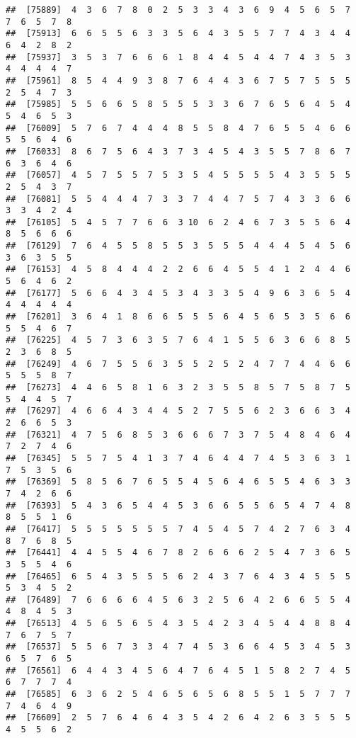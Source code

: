 \documentclass[
]{book}
\begin{document}
\begin{verbatim}
##  [75889]  4  3  6  7  8  0  2  5  3  3  4  3  6  9  4  5  6  5  7  7  6  5  7  8
##  [75913]  6  6  5  5  6  3  3  5  6  4  3  5  5  7  7  4  3  4  4  6  4  2  8  2
##  [75937]  3  5  3  7  6  6  6  1  8  4  4  5  4  4  7  4  3  5  3  4  4  4  4  7
##  [75961]  8  5  4  4  9  3  8  7  6  4  4  3  6  7  5  7  5  5  5  2  5  4  7  3
##  [75985]  5  5  6  6  5  8  5  5  5  3  3  6  7  6  5  6  4  5  4  5  4  6  5  3
##  [76009]  5  7  6  7  4  4  4  8  5  5  8  4  7  6  5  5  4  6  6  5  5  6  4  6
##  [76033]  8  6  7  5  6  4  3  7  3  4  5  4  3  5  5  7  8  6  7  6  3  6  4  6
##  [76057]  4  5  7  5  5  7  5  3  5  4  5  5  5  5  4  3  5  5  5  2  5  4  3  7
##  [76081]  5  5  4  4  4  7  3  3  7  4  4  7  5  7  4  3  3  6  6  3  3  4  2  4
##  [76105]  5  4  5  7  7  6  6  3 10  6  2  4  6  7  3  5  5  6  4  8  5  6  6  6
##  [76129]  7  6  4  5  5  8  5  5  3  5  5  5  4  4  4  5  4  5  6  3  6  3  5  5
##  [76153]  4  5  8  4  4  4  2  2  6  6  4  5  5  4  1  2  4  4  6  5  6  4  6  2
##  [76177]  5  6  6  4  3  4  5  3  4  3  3  5  4  9  6  3  6  5  4  4  4  4  4  4
##  [76201]  3  6  4  1  8  6  6  5  5  5  6  4  5  6  5  3  5  6  6  5  5  4  6  7
##  [76225]  4  5  7  3  6  3  5  7  6  4  1  5  5  6  3  6  6  8  5  2  3  6  8  5
##  [76249]  4  6  7  5  5  6  3  5  5  2  5  2  4  7  7  4  4  6  6  5  5  5  8  7
##  [76273]  4  4  6  5  8  1  6  3  2  3  5  5  8  5  7  5  8  7  5  5  4  4  5  7
##  [76297]  4  6  6  4  3  4  4  5  2  7  5  5  6  2  3  6  6  3  4  2  6  6  5  3
##  [76321]  4  7  5  6  8  5  3  6  6  6  7  3  7  5  4  8  4  6  4  7  2  7  4  6
##  [76345]  5  5  7  5  4  1  3  7  4  6  4  4  7  4  5  3  6  3  1  7  5  3  5  6
##  [76369]  5  8  5  6  7  6  5  5  4  5  6  4  6  5  5  4  6  3  3  7  4  2  6  6
##  [76393]  5  4  3  6  5  4  4  5  3  6  6  5  5  6  5  4  7  4  8  8  5  5  1  6
##  [76417]  5  5  5  5  5  5  5  7  4  5  4  5  7  4  2  7  6  3  4  8  7  6  8  5
##  [76441]  4  4  5  5  4  6  7  8  2  6  6  6  2  5  4  7  3  6  5  3  5  5  4  6
##  [76465]  6  5  4  3  5  5  5  6  2  4  3  7  6  4  3  4  5  5  5  5  3  4  5  2
##  [76489]  7  6  6  6  6  4  5  6  3  2  5  6  4  2  6  6  5  5  4  4  8  4  5  3
##  [76513]  4  5  6  5  6  5  4  3  5  4  2  3  4  5  4  4  8  8  4  7  6  7  5  7
##  [76537]  5  5  6  7  3  3  4  7  4  5  3  6  6  4  5  3  4  5  3  6  5  7  6  5
##  [76561]  6  4  4  3  4  5  6  4  7  6  4  5  1  5  8  2  7  4  5  6  7  7  7  4
##  [76585]  6  3  6  2  5  4  6  5  6  5  6  8  5  5  1  5  7  7  7  7  4  6  4  9
##  [76609]  2  5  7  6  4  6  4  3  5  4  2  6  4  2  6  3  5  5  5  4  5  5  6  2

\end{verbatim}
\end{document}
